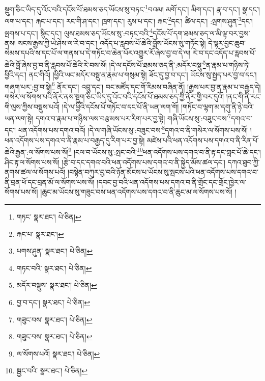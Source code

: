 སྡུག་ཅིང་ཡིད་དུ་འོང་བའི་དངོས་པོ་ཐམས་ཅད་ཡོངས་སུ་བཏང་\footnote{གཏང་  སྣར་ཐང་།  པེ་ཅིན། }བའམ། མགོ་དང་། མིག་དང་། རྣ་བ་དང་། སྣ་དང་། ལག་པ་དང་། རྐང་པ་དང་། རང་གི་ཤ་དང་། ཁྲག་དང་། རུས་པ་དང་། རྐང་\footnote{རྐང་པ་  སྣར་ཐང་། }དང་། ཚིལ་དང་། :ལྤགས་ཤུན་\footnote{པགས་ཤུན་  སྣར་ཐང་།  པེ་ཅིན། }དང་། ལྤགས་པ་དང་། སྙིང་དང་། ལུས་ཐམས་ཅད་ཡོངས་སུ་:བཏང་བའི་\footnote{གཏང་བའི་  སྣར་ཐང་།  པེ་ཅིན། }དངོས་པོ་དག་ཐམས་ཅད་ལ་མི་ལྟ་བར་བྱས་ནས། སངས་རྒྱས་ཀྱི་ཡེ་ཤེས་ལ་རེ་བ་དང་། འདོད་པ་རླབས་པོ་ཆེའི་བློས་ཡོངས་སུ་གཏོང་སྟེ། དེ་ལྟར་བྱང་ཆུབ་སེམས་དཔའི་ས་དང་པོ་ལ་གནས་པ་དེ་གཏོང་བ་ཆེན་པོར་འགྱུར་རོ་ཞེས་བྱ་བ་དེ་ལ། རེ་བ་དང་འདོད་པ་རླབས་པོ་ཆེའི་བློ་ཞེས་བྱ་བ་ནི་རླབས་པོ་ཆེའི་རེ་བས་སོ། །དེ་ལ་དངོས་པོ་ཐམས་ཅད་ནི་:མདོར་བསྡུ་\footnote{མདོར་བསྡུས་  སྣར་ཐང་།  པེ་ཅིན། }ན་རྣམ་པ་གཉིས་ཏེ། ཕྱིའི་དང་། ནང་གིའོ། །ཕྱིའི་ཡང་མདོར་བསྡུ་ན་རྣམ་པ་གསུམ་སྟེ། ཟོང་དུ་བྱ་བ་དང་། ཡོངས་སུ་སྤྱད་པར་བྱ་བ་དང་། གཞག་པར་:བྱ་བ་སྟེ།\footnote{བྱ་བ་དང་།  སྣར་ཐང་།  པེ་ཅིན། } ནོར་དང་། འབྲུ་དང་། བང་མཛོད་དང་གོ་རིམས་བཞིན་ནོ། །རྒྱས་པར་བྱ་ན་རྣམ་པ་བརྒྱད་དེ། གསེར་ལ་སོགས་པའི་ནོར་ནས་སྡུག་ཅིང་ཡིད་དུ་འོང་བའི་དངོས་པོ་ཐམས་ཅད་ཀྱི་ནོར་གྱི་བར་དུའོ། །ནང་གི་ནི་རང་གི་ལུས་ཀྱིས་བསྡུས་པའོ། །དེ་ལ་ཕྱིའི་དངོས་པོ་གཏོང་བ་དང་པོ་ནི་ཡན་ལག་གོ། །གཏོང་བ་ལྷག་མ་དགུ་ནི་ཉེ་བའི་ཡན་ལག་སྟེ། དགའ་བ་རྣམ་པ་གཉིས་ལས་བརྩམས་པར་རིག་པར་བྱ་སྟེ། གཞི་ཡོངས་སུ་:བཟུང་བས་\footnote{གཟུང་བས་  སྣར་ཐང་།  པེ་ཅིན། }དགའ་བ་དང་། ཕན་འདོགས་པས་དགའ་བའོ། །དེ་ལ་གཞི་ཡོངས་སུ་:བཟུང་བས་\footnote{གཟུང་བས་  སྣར་ཐང་།  པེ་ཅིན། }དགའ་བ་ནི་གསེར་ལ་སོགས་པས་སོ། །ཕན་འདོགས་པས་དགའ་བ་ནི་རྣམ་པ་བརྒྱད་དུ་རིག་པར་བྱ་སྟེ། མཛེས་པའི་ཕན་འདོགས་པས་དགའ་བ་ནི་རིན་པོ་ཆེའི་རྒྱན་:ལ་སོགས་པས་སོ།\footnote{ལ་སོགས་པའོ།  སྣར་ཐང་།  པེ་ཅིན། } །ངལ་བ་ཡོངས་སུ་:སྤང་བའི་\footnote{སྦྱང་བའི་  སྣར་ཐང་།  པེ་ཅིན། }ཕན་འདོགས་པས་དགའ་བ་ནི་རྟ་དང་གླང་པོ་ཆེ་དང་། ཤིང་རྟ་ལ་སོགས་པས་སོ། །རྩེ་བ་དང་དགའ་བའི་ཕན་འདོགས་པས་དགའ་བ་ནི་སྐྱེད་མོས་ཚལ་དང་། དཀའ་ཐུབ་ཀྱི་ནགས་ཚལ་ལ་སོགས་པའོ། །བསྙེན་བཀུར་བྱ་བའི་ཉོན་མོངས་པ་ཡོངས་སུ་སྤངས་པའི་ཕན་འདོགས་པས་དགའ་བ་ནི་བྲན་ཕོ་དང་བྲན་མོ་ལ་སོགས་པས་སོ། །དབང་བྱ་བའི་ཕན་འདོགས་པས་དགའ་བ་ནི་གྲོང་དང་གྲོང་ཁྱེར་ལ་སོགས་པས་སོ། །ཆུང་མ་ཡོངས་སུ་གཟུང་བས་ཕན་འདོགས་པས་དགའ་བ་ནི་ཆུང་མ་ལ་སོགས་པས་སོ། །
